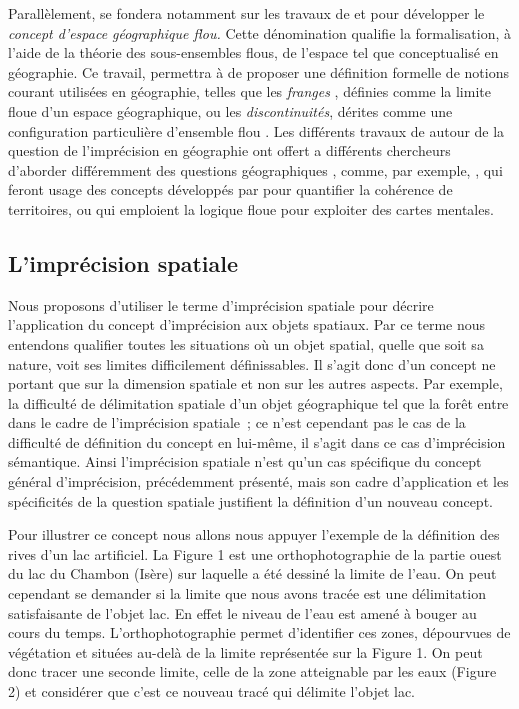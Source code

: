 Parallèlement, \textcite{Rolland-May1984,Rolland-May1987} se fondera
notamment sur les travaux de  et  pour développer
le \emph{concept d’espace géographique flou.} Cette dénomination
qualifie la formalisation, à l’aide de la théorie des sous-ensembles
flous, de l’espace tel que conceptualisé en géographie. Ce travail,
permettra à  de proposer une définition formelle de
notions courant utilisées en géographie, telles que les \emph{franges}
\autocite{Rolland-May1987}, définies comme la limite floue d’un espace
géographique, ou les \emph{discontinuités}, dérites comme une
configuration particulière d’ensemble flou
\autocite{Rolland-May2003}. Les différents travaux de
 autour de la question de l’imprécision en géographie
ont offert a différents chercheurs d’aborder différemment des
questions géographiques \autocite{Dutozia2014}, comme, par exemple,
\textcite{deRuffray2009}, qui feront usage des concepts développés par
 pour quantifier la cohérence de territoires, ou
\textcite{Didelon2013} qui emploient la logique floue pour exploiter
des cartes mentales.

\subsection{L’imprécision spatiale}

Nous proposons d’utiliser le terme d’imprécision spatiale pour décrire
l’application du concept d’imprécision aux objets spatiaux. Par ce
terme nous entendons qualifier toutes les situations où un objet
spatial, quelle que soit sa nature, voit ses limites difficilement
définissables. Il s’agit donc d’un concept ne portant que sur la
dimension spatiale et non sur les autres aspects. Par exemple, la
difficulté de délimitation spatiale d’un objet géographique tel que la
forêt entre dans le cadre de l’imprécision spatiale ; ce n’est
cependant pas le cas de la difficulté de définition du concept en
lui-même, il s’agit dans ce cas d’imprécision sémantique. Ainsi
l’imprécision spatiale n’est qu’un cas spécifique du concept général
d’imprécision, précédemment présenté, mais son cadre d’application et
les spécificités de la question spatiale justifient la définition d’un
nouveau concept.

Pour illustrer ce concept nous allons nous appuyer l’exemple de la
définition des rives d’un lac artificiel. La Figure 1 est une
orthophotographie de la partie ouest du lac du Chambon (Isère) sur
laquelle a été dessiné la limite de l’eau. On peut cependant se
demander si la limite que nous avons tracée est une délimitation
satisfaisante de l’objet lac. En effet le niveau de l’eau est amené à
bouger au cours du temps. L’orthophotographie permet d’identifier ces
zones, dépourvues de végétation et situées au-delà de la limite
représentée sur la Figure 1. On peut donc tracer une seconde limite,
celle de la zone atteignable par les eaux (Figure 2) et considérer que
c’est ce nouveau tracé qui délimite l’objet lac.

